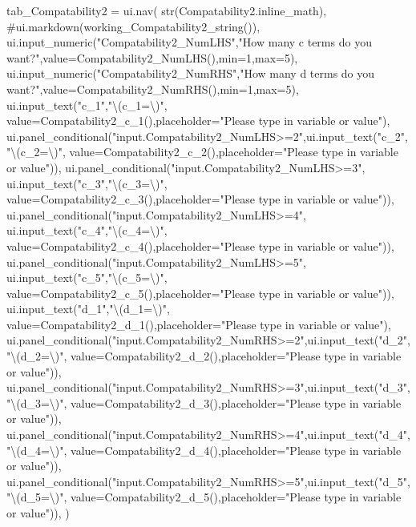 \documentclass[
  letterpaper,
  DIV=11,
  numbers=noendperiod]{scrreprt}
\newenvironment{Shaded}{\begin{snugshade}}{\end{snugshade}}
\newcommand{\NormalTok}[1]{\textcolor[rgb]{0.00,0.23,0.31}{#1}}
\begin{document}
\begin{Shaded}
\begin{Highlighting}[]
\NormalTok{        tab\_Compatability2 = ui.nav(}
\NormalTok{                str(Compatability2.inline\_math),}
\NormalTok{                \#ui.markdown(working\_Compatability2\_string()),}
\NormalTok{                ui.input\_numeric("Compatability2\_NumLHS","How many \textquotesingle{}c\textquotesingle{} terms do you want?",value=Compatability2\_NumLHS(),min=1,max=5),}
\NormalTok{                ui.input\_numeric("Compatability2\_NumRHS","How many \textquotesingle{}d\textquotesingle{} terms do you want?",value=Compatability2\_NumRHS(),min=1,max=5),}
\NormalTok{                ui.input\_text("c\_1","\textbackslash{}(c\_1=\textbackslash{})", value=Compatability2\_c\_1(),placeholder="Please type in variable or value"),}
\NormalTok{                ui.panel\_conditional("input.Compatability2\_NumLHS\textgreater{}=2",ui.input\_text("c\_2","\textbackslash{}(c\_2=\textbackslash{})", value=Compatability2\_c\_2(),placeholder="Please type in variable or value")),}
\NormalTok{                ui.panel\_conditional("input.Compatability2\_NumLHS\textgreater{}=3", ui.input\_text("c\_3","\textbackslash{}(c\_3=\textbackslash{})", value=Compatability2\_c\_3(),placeholder="Please type in variable or value")),}
\NormalTok{                ui.panel\_conditional("input.Compatability2\_NumLHS\textgreater{}=4", ui.input\_text("c\_4","\textbackslash{}(c\_4=\textbackslash{})", value=Compatability2\_c\_4(),placeholder="Please type in variable or value")),}
\NormalTok{                ui.panel\_conditional("input.Compatability2\_NumLHS\textgreater{}=5", ui.input\_text("c\_5","\textbackslash{}(c\_5=\textbackslash{})", value=Compatability2\_c\_5(),placeholder="Please type in variable or value")),}
\NormalTok{                ui.input\_text("d\_1","\textbackslash{}(d\_1=\textbackslash{})", value=Compatability2\_d\_1(),placeholder="Please type in variable or value"),}
\NormalTok{                ui.panel\_conditional("input.Compatability2\_NumRHS\textgreater{}=2",ui.input\_text("d\_2","\textbackslash{}(d\_2=\textbackslash{})", value=Compatability2\_d\_2(),placeholder="Please type in variable or value")),}
\NormalTok{                ui.panel\_conditional("input.Compatability2\_NumRHS\textgreater{}=3",ui.input\_text("d\_3","\textbackslash{}(d\_3=\textbackslash{})", value=Compatability2\_d\_3(),placeholder="Please type in variable or value")),}
\NormalTok{                ui.panel\_conditional("input.Compatability2\_NumRHS\textgreater{}=4",ui.input\_text("d\_4","\textbackslash{}(d\_4=\textbackslash{})", value=Compatability2\_d\_4(),placeholder="Please type in variable or value")),}
\NormalTok{                ui.panel\_conditional("input.Compatability2\_NumRHS\textgreater{}=5",ui.input\_text("d\_5","\textbackslash{}(d\_5=\textbackslash{})", value=Compatability2\_d\_5(),placeholder="Please type in variable or value")),}
\NormalTok{                )}


\end{Highlighting}
\end{Shaded}
\end{document}
